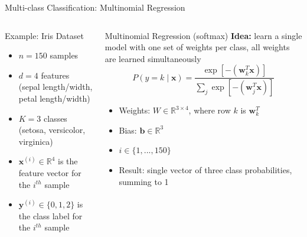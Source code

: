 \documentclass[
                en,
                ]{sdqbeamer}
\begin{document}
\begin{frame}{Multi-class Classification: Multinomial Regression}
    \begin{columns}
        \column{\kitthreecolumns}
        \begin{greenblock}{Example: Iris Dataset}
            \begin{itemize}
                \item $n = 150$ samples
                \item $d = 4$ features (sepal length/width, petal length/width)
                \item $K = 3$ classes (setosa, versicolor, virginica)
                \item $\boldsymbol{x}^{(i)} \in \mathbb{R}^4$ is the feature
                    vector for the $i^{th}$ sample
                \item $\boldsymbol{y}^{(i)} \in \{0, 1, 2\}$ is the class label
                    for the $i^{th}$ sample
            \end{itemize}
        \end{greenblock}

        \column{\kitthreecolumns}

        \begin{greenblock}{Multinomial Regression (softmax)}
            \textbf{Idea:} learn a single model with one set of weights per
            class, all weights are learned simultaneously
            \begin{equation*}
                P(y = k \mid \boldsymbol{x}) = \frac{\exp[-(\boldsymbol{w}_k^T
                \boldsymbol{x})]}{\sum_j \exp[-(\boldsymbol{w}_j^T
            \boldsymbol{x})]}
            \end{equation*}
            \begin{itemize}
                \item Weights: $W \in \mathbb{R}^{3 \times 4}$, where row $k$ is
                    $\boldsymbol{w}_k^T$
                \item Bias: $\boldsymbol{b} \in \mathbb{R}^3$
                \item $i \in \{1, ..., 150\}$
                \item Result: single vector of three class probabilities,
                    summing to 1
            \end{itemize}
        \end{greenblock}
    \end{columns}
\end{frame}
\end{document}
